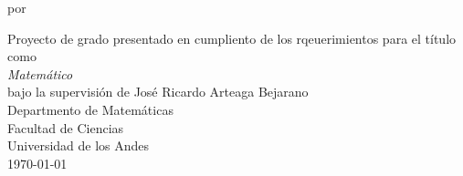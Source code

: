 \begin{titlepage}
\begin{center}

\Huge
\makeatletter
\textbf{\@title}

\Large

\vspace{3.cm}

por \textbf{\@author{}}

\vfill
\large
Proyecto de grado presentado en cumpliento de los rqeuerimientos para el título como\\
\textit{Matemático}\\
bajo la supervisión de José Ricardo Arteaga Bejarano\\
\vfill
\large
Departmento de Matemáticas\\
Facultad de Ciencias\\
Universidad de los Andes\\

\today
\makeatother

\end{center}
\end{titlepage}
